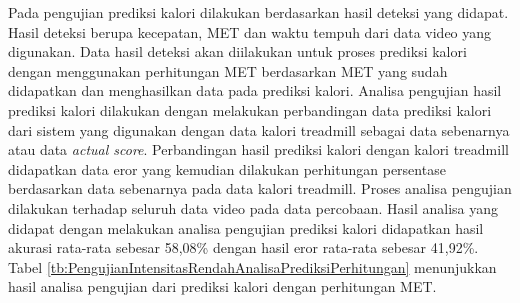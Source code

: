 Pada pengujian prediksi kalori dilakukan berdasarkan hasil deteksi yang didapat. Hasil deteksi berupa kecepatan, MET dan waktu tempuh dari data video yang digunakan. Data hasil deteksi akan diilakukan untuk proses prediksi kalori dengan menggunakan perhitungan MET berdasarkan MET yang sudah didapatkan dan menghasilkan data pada prediksi kalori. Analisa pengujian hasil prediksi kalori dilakukan dengan melakukan perbandingan data prediksi kalori dari sistem yang digunakan dengan data kalori treadmill sebagai data sebenarnya atau data \emph{actual score}. Perbandingan hasil prediksi kalori dengan kalori treadmill didapatkan data eror yang kemudian dilakukan perhitungan persentase berdasarkan data sebenarnya pada data kalori treadmill. Proses analisa pengujian dilakukan terhadap seluruh data video pada data percobaan. Hasil analisa yang didapat dengan melakukan analisa pengujian prediksi kalori didapatkan hasil akurasi rata-rata sebesar 58,08\% dengan hasil eror rata-rata sebesar 41,92\%. Tabel \ref{tb:PengujianIntensitasRendahAnalisaPrediksiPerhitungan} menunjukkan hasil analisa pengujian dari prediksi kalori dengan perhitungan MET.

